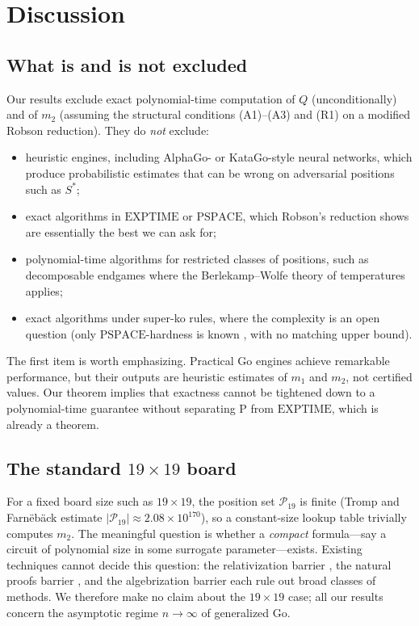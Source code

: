 \documentclass[11pt,a4paper]{amsart}
\theoremstyle{plain}
\theoremstyle{definition}
\theoremstyle{remark}
\newcommand{\PTIME}{\mathrm{P}}
\newcommand{\EXPTIME}{\mathrm{EXPTIME}}
\begin{document}
\section{Discussion}
\label{sec:disc}

\subsection{What is and is not excluded}

Our results exclude exact polynomial-time computation of $Q$
(unconditionally) and of $m_2$ (assuming the structural conditions
(A1)--(A3) and (R1) on a modified Robson reduction). They do
\emph{not} exclude:

\begin{itemize}[nosep]
  \item heuristic engines, including AlphaGo- or KataGo-style neural
        networks, which produce probabilistic estimates that can be
        wrong on adversarial positions such as $S^*$;
  \item exact algorithms in $\mathrm{EXPTIME}$ or $\mathrm{PSPACE}$,
        which Robson's reduction shows are essentially the best we can
        ask for;
  \item polynomial-time algorithms for restricted classes of positions,
        such as decomposable endgames where the
        Berlekamp--Wolfe theory \cite{BW94} of temperatures applies;
  \item exact algorithms under super-ko rules, where the complexity is
        an open question (only $\mathrm{PSPACE}$-hardness is known
        \cite{CT00}, with no matching upper bound).
\end{itemize}

The first item is worth emphasizing. Practical Go engines achieve
remarkable performance, but their outputs are heuristic estimates of
$m_1$ and $m_2$, not certified values. Our theorem implies that
exactness cannot be tightened down to a polynomial-time guarantee
without separating $\PTIME$ from $\EXPTIME$, which is already
a theorem.

\subsection{The standard $19 \times 19$ board}

For a fixed board size such as $19 \times 19$, the position set
$\mathcal{P}_{19}$ is finite (Tromp and Farn{\"e}b{\"a}ck \cite{TF16}
estimate $|\mathcal{P}_{19}| \approx 2.08 \times 10^{170}$),
so a constant-size lookup table trivially computes $m_2$. The
meaningful question is whether a \emph{compact} formula---say a circuit
of polynomial size in some surrogate parameter---exists. Existing
techniques cannot decide this question: the relativization barrier
\cite{BGS75}, the natural proofs barrier \cite{RR97}, and the
algebrization barrier \cite{AW09} each rule out broad classes of
methods. We therefore make no claim about the $19 \times 19$ case;
all our results concern the asymptotic regime $n \to \infty$ of
generalized Go.
\end{document}
